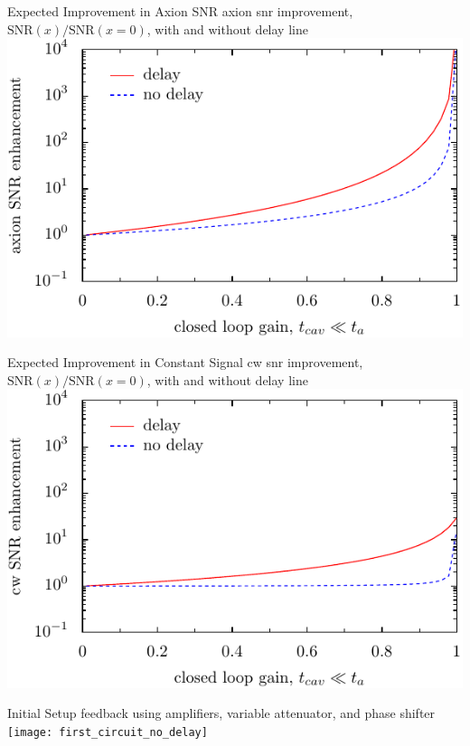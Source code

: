 \documentclass{beamer}
\begin{document}
\begin{frame}{Expected Improvement in Axion SNR}
{\tiny axion snr improvement, $\text{SNR}(x)/\text{SNR}(x=0)$, with and without delay line}
\includegraphics[width=\textwidth]{delay_no_delay}
\end{frame}

\begin{frame}{Expected Improvement in Constant Signal}
{\tiny cw snr improvement, $\text{SNR}(x)/\text{SNR}(x=0)$,  with and without delay line}
\includegraphics[width=\textwidth]{looking_at_coth}
\end{frame}

\begin{frame}{Initial Setup}
{\tiny feedback using amplifiers, variable attenuator, and phase shifter}
\texttt{[image: first\_circuit\_no\_delay]}
\end{frame}
\end{document}
